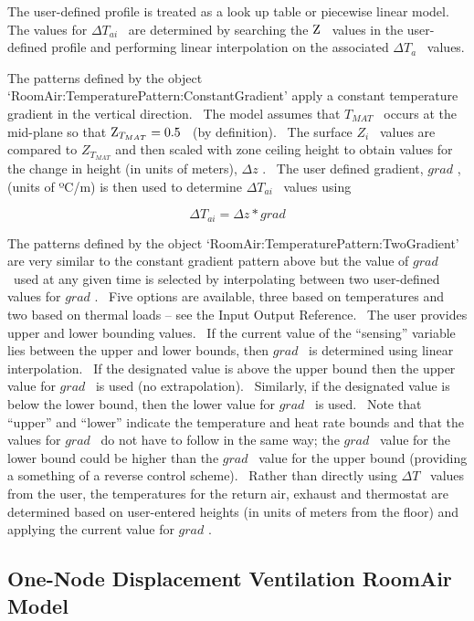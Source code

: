 The user-defined profile is treated as a look up table or piecewise linear model.~ The values for \(\Delta {T_{ai}}\) ~are determined by searching the \({\rm Z}\) ~values in the user-defined profile and performing linear interpolation on the associated \(\Delta {T_a}\) ~values.

The patterns defined by the object `RoomAir:TemperaturePattern:ConstantGradient' apply a constant temperature gradient in the vertical direction.~ The model assumes that \({T_{MAT}}\) ~occurs at the mid-plane so that \({{\rm Z}_{{T_{MAT}}}} = 0.5\) ~(by definition).~ The surface \({Z_i}\) ~values are compared to \({Z_{{T_{MAT}}}}\) and then scaled with zone ceiling height to obtain values for the change in height (in units of meters), \(\Delta z\) .~ The user defined gradient, \(grad\) , (units of ºC/m) is then used to determine \(\Delta {T_{ai}}\) ~values using

\begin{equation}
\Delta {T_{ai}} = \Delta z * grad
\end{equation}

The patterns defined by the object `RoomAir:TemperaturePattern:TwoGradient' are very similar to the constant gradient pattern above but the value of \(grad\) ~used at any given time is selected by interpolating between two user-defined values for \(grad\) .~ Five options are available, three based on temperatures and two based on thermal loads -- see the Input Output Reference.~ The user provides upper and lower bounding values.~ If the current value of the ``sensing'' variable lies between the upper and lower bounds, then \(grad\) ~is determined using linear interpolation.~ If the designated value is above the upper bound then the upper value for \(grad\) ~is used (no extrapolation).~ Similarly, if the designated value is below the lower bound, then the lower value for \(grad\) ~is used.~ Note that ``upper'' and ``lower'' indicate the temperature and heat rate bounds and that the values for \(grad\) ~do not have to follow in the same way; the \(grad\) ~value for the lower bound could be higher than the \(grad\) ~value for the upper bound (providing a something of a reverse control scheme).~ Rather than directly using \(\Delta T\) ~values from the user, the temperatures for the return air, exhaust and thermostat are determined based on user-entered heights (in units of meters from the floor) and applying the current value for \(grad\) .

\subsection{One-Node Displacement Ventilation RoomAir Model}\label{one-node-displacement-ventilation-roomair-model}

